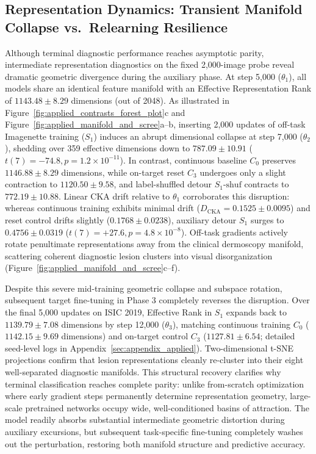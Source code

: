 \documentclass[sn-mathphys,Numbered]{sn-jnl}
\begin{document}
\subsection{Representation Dynamics: Transient Manifold Collapse vs.\ Relearning Resilience}\label{subsec:applied_geometry}

Although terminal diagnostic performance reaches asymptotic parity, intermediate representation diagnostics on the fixed 2,000-image probe reveal dramatic geometric divergence during the auxiliary phase. At step 5,000 ($\theta_1$), all models share an identical feature manifold with an Effective Representation Rank of $1143.48 \pm 8.29$ dimensions (out of 2048). As illustrated in Figure~\ref{fig:applied_contrasts_forest_plot}c and Figure~\ref{fig:applied_manifold_and_scree}a--b, inserting 2,000 updates of off-task Imagenette training ($S_1$) induces an abrupt dimensional collapse at step 7,000 ($\theta_2$), shedding over 359 effective dimensions down to $787.09 \pm 10.91$ ($t(7) = -74.8, p = 1.2 \times 10^{-11}$). In contrast, continuous baseline $C_0$ preserves $1146.88 \pm 8.29$ dimensions, while on-target reset $C_3$ undergoes only a slight contraction to $1120.50 \pm 9.58$, and label-shuffled detour $S_1\text{-shuf}$ contracts to $772.19 \pm 10.88$. Linear CKA drift relative to $\theta_1$ corroborates this disruption: whereas continuous training exhibits minimal drift ($D_{\mathrm{CKA}} = 0.1525 \pm 0.0095$) and reset control drifts slightly ($0.1768 \pm 0.0238$), auxiliary detour $S_1$ surges to $0.4756 \pm 0.0319$ ($t(7) = +27.6, p = 4.8 \times 10^{-8}$). Off-task gradients actively rotate penultimate representations away from the clinical dermoscopy manifold, scattering coherent diagnostic lesion clusters into visual disorganization (Figure~\ref{fig:applied_manifold_and_scree}c--f).

Despite this severe mid-training geometric collapse and subspace rotation, subsequent target fine-tuning in Phase 3 completely reverses the disruption. Over the final 5,000 updates on ISIC 2019, Effective Rank in $S_1$ expands back to $1139.79 \pm 7.08$ dimensions by step 12,000 ($\theta_3$), matching continuous training $C_0$ ($1142.15 \pm 9.69$ dimensions) and on-target control $C_3$ ($1127.81 \pm 6.54$; detailed seed-level logs in Appendix~\ref{sec:appendix_applied}). Two-dimensional t-SNE projections confirm that lesion representations cleanly re-cluster into their eight well-separated diagnostic manifolds. This structural recovery clarifies why terminal classification reaches complete parity: unlike from-scratch optimization where early gradient steps permanently determine representation geometry, large-scale pretrained networks occupy wide, well-conditioned basins of attraction. The model readily absorbs substantial intermediate geometric distortion during auxiliary excursions, but subsequent task-specific fine-tuning completely washes out the perturbation, restoring both manifold structure and predictive accuracy.
\end{document}
